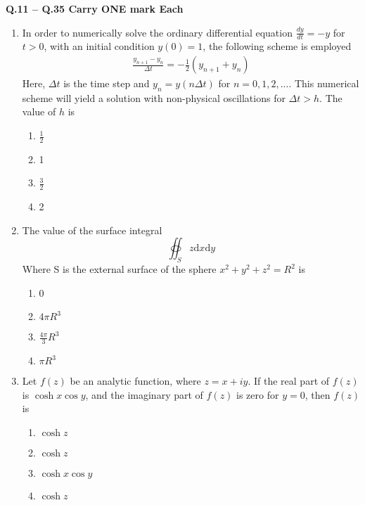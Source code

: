 \documentclass[journal,11pt,onecolumn]{IEEEtran}
\begin{document}
\large\textbf{Q.11 – Q.35 Carry ONE mark Each}\\

\begin{enumerate}[resume]

    \item In order to numerically solve the ordinary differential equation $\frac{dy}{dt} = -y$ for $t > 0$, with an initial condition $y(0) = 1$, the following scheme is employed
          \begin{align}
              \frac{y_{n+1} - y_n}{\Delta t} = -\frac{1}{2}(y_{n+1}+y_{n})
          \end{align}
          Here, $\Delta t$ is the time step and $y_n = y(n\Delta t)$ for $n = 0, 1, 2, ...$. This numerical scheme will yield a solution with non-physical oscillations for $\Delta t > h$. The value of $h$ is

          \begin{enumerate}
              \item $\frac{1}{2}$
              \item 1
              \item $\frac{3}{2}$
              \item 2
          \end{enumerate}

    \item The value of the surface integral
          \[
              \oiint_{S} z \mathrm{d}x \mathrm{d}y
          \]
          Where S is the external surface of the sphere $x^2 + y^2 + z^2 = R^2$ is

          \begin{enumerate}
              \item 0
              \item $4\pi R^3$
              \item $\frac{4\pi}{3} R^3$
              \item $\pi R^3$
          \end{enumerate}

    \item Let $f(z)$ be an analytic function, where $z = x + iy$. If the real part of $f(z)$ is $\cosh x \cos y$, and the imaginary part of $f(z)$ is zero for $y = 0$, then $f(z)$ is

          \begin{enumerate}
              \item $\cosh z$
              \item $\cosh z$
              \item $\cosh x \cos y$
              \item $\cosh z$
          \end{enumerate}


\end{enumerate}
\end{document}
